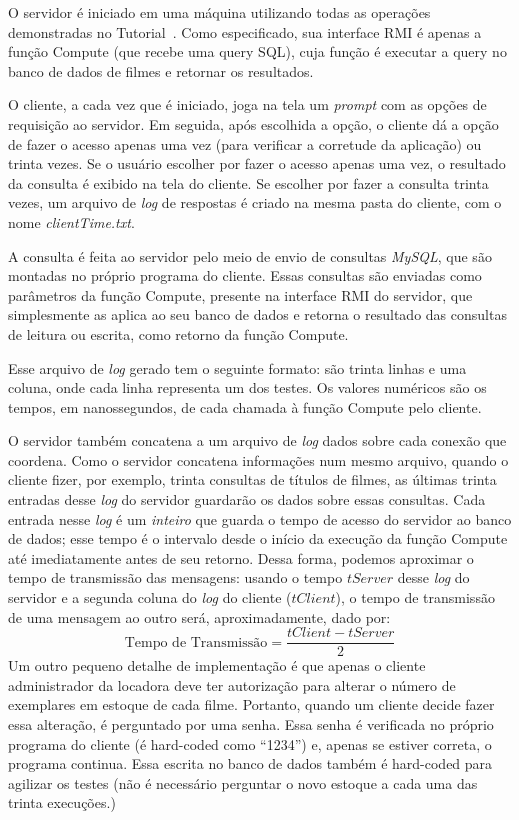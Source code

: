 \documentclass[12pt,a4paper]{article}
\begin{document}
O servidor é iniciado em uma máquina utilizando todas as operações demonstradas no Tutorial~\cite{RMITutorial}. Como especificado, sua interface RMI é apenas a função Compute (que recebe uma query SQL), cuja função é executar a query no banco de dados de filmes e retornar os resultados.

O cliente, a cada vez que é iniciado, joga na tela um {\it prompt} com as opções de requisição ao servidor. Em seguida, após escolhida a opção, o cliente dá a opção de fazer o acesso apenas uma vez (para verificar a corretude da aplicação) ou trinta vezes. Se o usuário escolher por fazer o acesso apenas uma vez, o resultado da consulta é exibido na tela do cliente. Se escolher por fazer a consulta trinta vezes, um arquivo de {\it log} de respostas é criado na mesma pasta do cliente, com o nome {\it clientTime.txt}.

A consulta é feita ao servidor pelo meio de envio de consultas {\it MySQL}, que são montadas no próprio programa do cliente. Essas consultas são enviadas como parâmetros da função Compute, presente na interface RMI do servidor, que simplesmente as aplica ao seu banco de dados e retorna o resultado das consultas de leitura ou escrita, como retorno da função Compute.

Esse arquivo de {\it log} gerado tem o seguinte formato: são trinta linhas e uma coluna, onde cada linha representa um dos testes. Os valores numéricos são os tempos, em nanossegundos, de cada chamada à função Compute pelo cliente.

O servidor também concatena a um arquivo de {\it log} dados sobre cada conexão que coordena. Como o servidor concatena informações num mesmo arquivo, quando o cliente fizer, por exemplo, trinta consultas de títulos de filmes, as últimas trinta entradas desse {\it log} do servidor guardarão os dados sobre essas consultas. Cada entrada nesse {\it log} é um {\it inteiro} que guarda o tempo de acesso do servidor ao banco de dados; esse tempo é o intervalo desde o início da execução da função Compute até imediatamente antes de seu retorno. Dessa forma, podemos aproximar o tempo de transmissão das mensagens: usando o tempo $ tServer $ desse {\it log} do servidor e a segunda coluna do {\it log} do cliente ($ tClient $), o tempo de transmissão de uma mensagem ao outro será, aproximadamente, dado por:
\begin{equation}
{\text {Tempo de Transmissão}} = \frac{tClient - tServer}{2}
\label{eqn:time}
\end{equation}
Um outro pequeno detalhe de implementação é que apenas o cliente administrador da locadora deve ter autorização para alterar o número de exemplares em estoque de cada filme. Portanto, quando um cliente decide fazer essa alteração, é perguntado por uma senha. Essa senha é verificada no próprio programa do cliente (é hard-coded como “1234”) e, apenas se estiver correta, o programa continua. Essa escrita no banco de dados também é hard-coded para agilizar os testes (não é necessário perguntar o novo estoque a cada uma das trinta execuções.)
\end{document}
